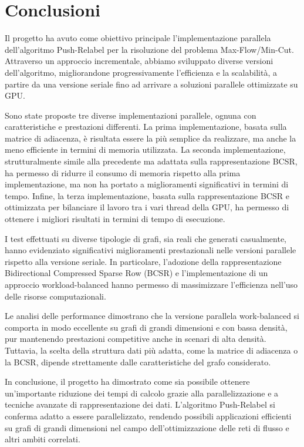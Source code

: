 \chapter{Conclusioni}

    Il progetto ha avuto come obiettivo principale l'implementazione parallela dell'algoritmo Push-Relabel per la risoluzione del problema Max-Flow/Min-Cut. Attraverso un approccio incrementale, abbiamo sviluppato diverse versioni dell'algoritmo, migliorandone progressivamente l'efficienza e la scalabilità, a partire da una versione seriale fino ad arrivare a soluzioni parallele ottimizzate su GPU.

    Sono state proposte tre diverse implementazioni parallele, ognuna con caratteristiche e prestazioni differenti. 
    La prima implementazione, basata sulla matrice di adiacenza, è risultata essere la più semplice da realizzare, ma anche la meno efficiente in termini di memoria utilizzata. 
    La seconda implementazione, strutturalmente simile alla precedente ma adattata sulla rappresentazione BCSR, ha permesso di ridurre il consumo di memoria rispetto alla prima implementazione, ma non ha portato a miglioramenti significativi in termini di tempo. 
    Infine, la terza implementazione, basata sulla rappresentazione BCSR e ottimizzata per bilanciare il lavoro tra i vari thread della GPU, ha permesso di ottenere i migliori risultati in termini di tempo di esecuzione.
    
    I test effettuati su diverse tipologie di grafi, sia reali che generati casualmente, hanno evidenziato significativi miglioramenti prestazionali nelle versioni parallele rispetto alla versione seriale. In particolare, l'adozione della rappresentazione Bidirectional Compressed Sparse Row (BCSR) e l'implementazione di un approccio workload-balanced hanno permesso di massimizzare l'efficienza nell'uso delle risorse computazionali.

    Le analisi delle performance dimostrano che la versione parallela work-balanced si comporta in modo eccellente su grafi di grandi dimensioni e con bassa densità, pur mantenendo prestazioni competitive anche in scenari di alta densità. Tuttavia, la scelta della struttura dati più adatta, come la matrice di adiacenza o la BCSR, dipende strettamente dalle caratteristiche del grafo considerato.

    In conclusione, il progetto ha dimostrato come sia possibile ottenere un'importante riduzione dei tempi di calcolo grazie alla parallelizzazione e a tecniche avanzate di rappresentazione dei dati. L'algoritmo Push-Relabel si conferma adatto a essere parallelizzato, rendendo possibili applicazioni efficienti su grafi di grandi dimensioni nel campo dell'ottimizzazione delle reti di flusso e altri ambiti correlati.
